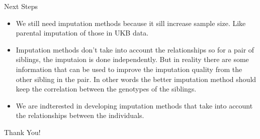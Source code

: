 \documentclass{beamer}
\begin{document}
\begin{frame}{Next Steps}
    \begin{itemize}
      \item We still need imputation methods because it sill increase sample size. Like parental imputation of those in UKB data.
      \item Imputation methods don't take into account the relationships so for a pair of siblings, the imputaion is done independently.
      But in reality there are some information that can be used to improve the imputation quality from the other sibling in the pair.
      In other words the better imputation method should keep the correlation between the genotypes of the siblings.
      \item We are indterested in developing imputation methods that take into account the relationships between the individuals.
    \end{itemize}
\end{frame}

\begin{frame}[plain]
      \huge{Thank You!}
\end{frame}
\end{document}
